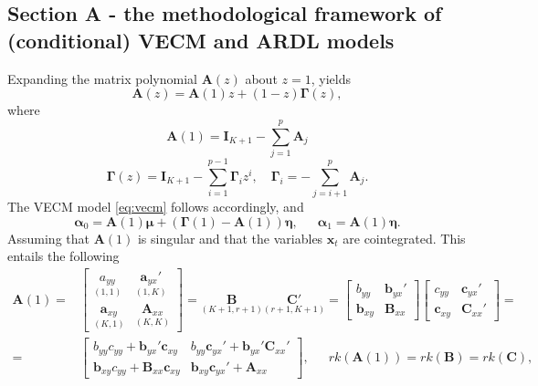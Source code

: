 \subsection{Section A - the methodological framework of (conditional) VECM and ARDL models} \label{sec:appendixa}
Expanding the matrix polynomial $\mathbf{A}(z)$ about $z=1$, yields
\begin{equation}\label{eq:polyamat}
\mathbf{A}(z)=\mathbf{A}(1)z+(1-z)\boldsymbol{\Gamma}(z),
\end{equation}
where
\begin{equation}
\mathbf{A}(1)=\mathbf{I}_{K+1}-\sum_{j=1}^{p}\mathbf{A}_{j}
\end{equation}
\begin{equation}\label{eq:polygamma}
\boldsymbol{\Gamma}(z)=\mathbf{I}_{K+1}-\sum_{i=1}^{p-1}\boldsymbol{\Gamma}_{i}z^i, \enspace \enspace \boldsymbol{\Gamma}_{i}=-\sum_{j=i+1}^{p}\mathbf{A}_j.
\end{equation}
The VECM model \eqref{eq:vecm} follows accordingly, and
\begin{equation}\label{eq:vecmint}
\boldsymbol{\alpha}_0=\mathbf{A}(1)\boldsymbol{\mu}+(\boldsymbol{\Gamma}(1)-\mathbf{A}(1))\boldsymbol{\eta}, \enspace \enspace \enspace \boldsymbol{\alpha}_1=\mathbf{A}(1)\boldsymbol{\eta}.
\end{equation}
Assuming that $\mathbf{A}(1)$ is singular and that 
the variables $\mathbf{x}_{t}$ are cointegrated. This entails the following 
\begin{align}\label{eq:factt}
    \mathbf{A}(1)=&\begin{bmatrix}
\underset{(1,1)}{a_{yy}} & \underset{(1,K)}{\mathbf{a}_{yx}'} \\ \underset{(K,1)}{\mathbf{a}_{xy}} & \underset{(K,K)}{\mathbf{A}_{xx}}  
\end{bmatrix}=\underset{(K+1,r+1)}{\mathbf{B}}\underset{(r+1,K+1)}{\mathbf{C}'}=\begin{bmatrix}b_{yy} & \mathbf{b}_{yx}'\\  \mathbf{b}_{xy} & \mathbf{B}_{xx} \end{bmatrix}\begin{bmatrix}c_{yy} & \mathbf{c}_{yx}'\\  \mathbf{c}_{xy} & \mathbf{C}_{xx}'\end{bmatrix}= \nonumber\\
=&\begin{bmatrix}b_{yy}c_{yy}+\mathbf{b}_{yx}'\mathbf{c}_{xy} & b_{yy}\mathbf{c}_{yx}'+\mathbf{b}_{yx}'\mathbf{C}_{xx}'\\
\mathbf{b}_{xy}c_{yy}+\mathbf{B}_{xx}\mathbf{c}_{xy} & \mathbf{b}_{xy}\mathbf{c}_{yx}'+ \mathbf{A}_{xx} \end{bmatrix}, \enspace \enspace \enspace rk(\mathbf{A}(1))=rk(\mathbf{B})=rk(\mathbf{C}),
\end{align}
